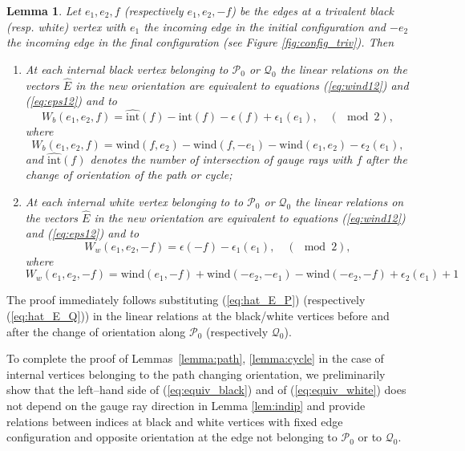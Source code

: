 \documentclass[11pt]{amsart}
\theoremstyle{plain}
\numberwithin{equation}{section}
\newtheorem{lemma}[theorem]{Lemma}
\begin{document}
\begin{lemma}
\label{lemma:equiv_rel}
Let $e_1,e_2,f$ (respectively $e_1,e_2,-f$) be the edges at a trivalent black (resp. white) vertex with $e_1$ the incoming edge in the initial configuration and $-e_2$ the incoming edge in the final configuration (see Figure \ref{fig:config_triv}). 
Then 
\begin{enumerate}
\item At each internal black vertex belonging to $\mathcal P_0$ or $\mathcal Q_0$ the linear relations on the vectors $\hat E$ in the new orientation are equivalent to equations (\ref{eq:wind12}) and (\ref{eq:eps12}) and to
\begin{equation}
\label{eq:equiv_black}
W_b(e_1,e_2,f) = \widehat{\mbox{int}}(f) - \mbox{int}(f)-\epsilon(f) +\epsilon_1(e_1), \quad
(\!\!\!\!\!\!\mod 2),
\end{equation}
where
\begin{equation}\label{eq:W_b}
W_b(e_1,e_2,f)=\mbox{wind}(f,e_2)-\mbox{wind}(f,-e_1)-\mbox{wind}(e_1,e_2)-\epsilon_2(e_1),
\end{equation}
and $\widehat{\mbox{int}}(f)$ denotes the number of intersection of gauge rays with $f$ after the change of orientation of the path or cycle;
\item At each internal white vertex belonging to to $\mathcal P_0$ or $\mathcal Q_0$ the linear relations on the vectors $\hat E$ in the new orientation are equivalent to equations (\ref{eq:wind12}) and (\ref{eq:eps12}) and to
\begin{equation}
\label{eq:equiv_white}
 W_w(e_1,e_2,-f) = \epsilon(-f)-\epsilon_1(e_1),\quad
(\!\!\!\!\!\!\mod 2),
\end{equation}
where
\begin{equation}\label{eq:W_w}
W_w(e_1,e_2,-f)=\mbox{wind}(e_1,-f)+\mbox{wind}(-e_2,-e_1)-\mbox{wind}(-e_2,-f)+\epsilon_2(e_1)+1
\end{equation}
\end{enumerate}
\end{lemma}

The proof immediately follows substituting (\ref{eq:hat_E_P}) (respectively (\ref{eq:hat_E_Q})) in the linear relations at the black/white vertices before and after the change of orientation along $\mathcal P_0$ (respectively $\mathcal Q_0$).


To complete the proof of Lemmas~\ref{lemma:path}, \ref{lemma:cycle} in the case of internal vertices belonging to the path changing orientation, we preliminarily show that the left--hand side of (\ref{eq:equiv_black}) and of (\ref{eq:equiv_white}) does not depend
on the gauge ray direction in Lemma \ref{lem:indip} and provide relations between indices at black and white vertices with fixed edge configuration and opposite orientation at the edge not belonging to $\mathcal P_0$ or to $\mathcal Q_0$.
\end{document}
